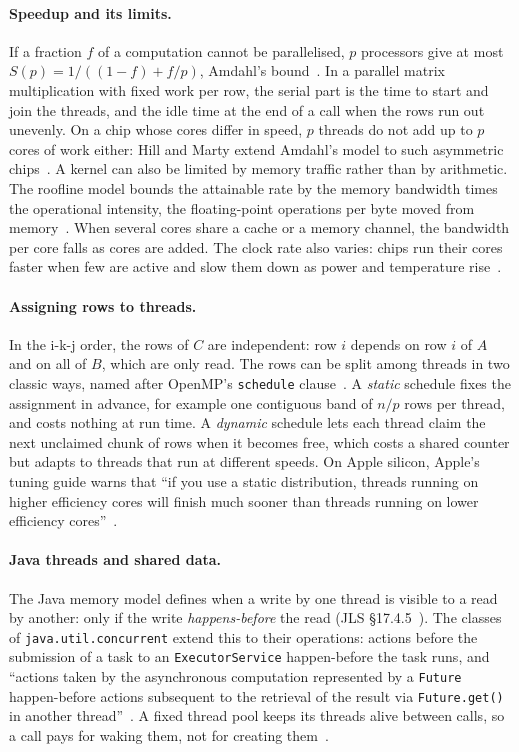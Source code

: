 \documentclass[11pt,a4paper]{article}
\begin{document}
\paragraph{Speedup and its limits.} If a fraction $f$ of a computation cannot
be parallelised, $p$ processors give at most $S(p)=1/((1-f)+f/p)$, Amdahl's
bound~\cite{amdahl1967}. In a parallel matrix multiplication with fixed work
per row, the serial part is the time to start and join the threads, and the
idle time at the end of a call when the rows run out unevenly. On a chip whose
cores differ in speed, $p$ threads do not add up to $p$ cores of work either:
Hill and Marty extend Amdahl's model to such asymmetric chips~\cite{hill2008}.
A kernel can also be limited by memory traffic rather than by arithmetic. The
roofline model bounds the attainable rate by the memory bandwidth times the
operational intensity, the floating-point operations per byte moved from
memory~\cite{williams2009}. When several cores share a cache or a memory
channel, the bandwidth per core falls as cores are added. The clock rate also
varies: chips run their cores faster when few are active and slow them down as
power and temperature rise~\cite{hennessy2019}.

\paragraph{Assigning rows to threads.} In the i-k-j order, the rows of $C$ are
independent: row $i$ depends on row $i$ of $A$ and on all of $B$, which are
only read. The rows can be split among threads in two classic ways, named after
OpenMP's \texttt{schedule} clause~\cite{openmp52}. A \emph{static} schedule
fixes the assignment in advance, for example one contiguous band of $n/p$ rows
per thread, and costs nothing at run time. A \emph{dynamic} schedule lets each
thread claim the next unclaimed chunk of rows when it becomes free, which costs
a shared counter but adapts to threads that run at different speeds. On Apple
silicon, Apple's tuning guide warns that ``if you use a static distribution,
threads running on higher efficiency cores will finish much sooner than threads
running on lower efficiency cores''~\cite{appletuning}.

\paragraph{Java threads and shared data.} The Java memory model defines when a
write by one thread is visible to a read by another: only if the write
\emph{happens-before} the read (JLS \S17.4.5~\cite{jls25}). The classes of
\texttt{java.util.concurrent} extend this to their operations: actions before
the submission of a task to an \texttt{ExecutorService} happen-before the task
runs, and ``actions taken by the asynchronous computation represented by a
\texttt{Future} happen-before actions subsequent to the retrieval of the result
via \texttt{Future.get()} in another thread''~\cite{juc25}. A fixed thread pool
keeps its threads alive between calls, so a call pays for waking them, not for
creating them~\cite{goetz2006}.
\end{document}
